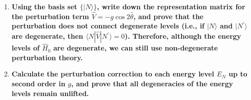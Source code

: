 \documentclass[../../main.tex]{subfiles}
\begin{document}
\begin{enumerate}
  \item \textbf{Using the basis set $\{|N\rangle\}$, write down the representation matrix for the perturbation term $\hat{V} = -g\cos{2\hat{\theta}}$, and prove that the perturbation does not connect degenerate levels (i.e., if $|N\rangle$ and $|N^{\prime}\rangle$ are degenerate, then $\langle N|\hat{V}|N^{\prime}\rangle = 0$). Therefore, although the energy levels of $\hat{H}_{0}$ are degenerate, we can still use non-degenerate perturbation theory.}
  
{}

  \item  \textbf{Calculate the perturbation correction to each energy level $E_{N}$ up to second order in $g$, and prove that all degeneracies of the energy levels remain unlifted.}


\end{enumerate}
\end{document}
